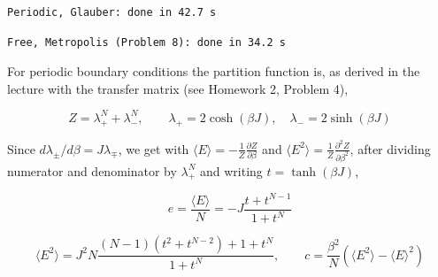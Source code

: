 \documentclass[11pt]{article}
\begin{document}
    \begin{Verbatim}[commandchars=\\\{\}]
Periodic, Glauber: done in 42.7 s
    \end{Verbatim}

    \begin{Verbatim}[commandchars=\\\{\}]
Free, Metropolis (Problem 8): done in 34.2 s
    \end{Verbatim}

    For periodic boundary conditions the partition function is, as derived
in the lecture with the transfer matrix (see Homework 2, Problem 4),

\[
Z=\lambda_+^N+\lambda_-^N, \qquad \lambda_+=2\cosh(\beta J), \quad \lambda_-=2\sinh(\beta J) \tag{8}
\]

Since \(d\lambda_\pm/d\beta=J\lambda_\mp\), we get with
\(\langle E\rangle=-\frac{1}{Z}\frac{\partial Z}{\partial\beta}\) and
\(\langle E^2\rangle=\frac{1}{Z}\frac{\partial^2 Z}{\partial\beta^2}\),
after dividing numerator and denominator by \(\lambda_+^N\) and writing
\(t=\tanh(\beta J)\),

\[
e=\frac{\langle E\rangle}{N}=-J\frac{t+t^{N-1}}{1+t^N} \tag{9}
\]

\[
\langle E^2\rangle=J^2N\frac{(N-1)\left(t^2+t^{N-2}\right)+1+t^N}{1+t^N}, \qquad c=\frac{\beta^2}{N}\left(\langle E^2\rangle-\langle E\rangle^2\right) \tag{10}
\]
\end{document}
